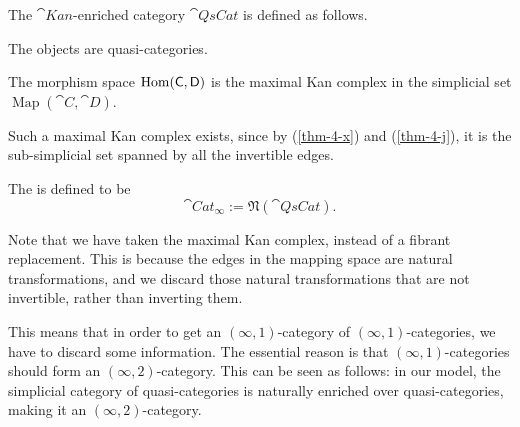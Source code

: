 \begin{example}
    The $\cat{Kan}$-enriched category $\cat{QsCat}$
    is defined as follows.
    \begin{itms}
        \item The objects are quasi-categories.
        \item The morphism space $\operatorname{Hom}(\mathsf{C},\mathsf{D})$
        is the maximal Kan complex in the simplicial set $\operatorname{Map}(\cat C,\cat D)$.
    \end{itms}
    Such a maximal Kan complex exists,
    since by (\ref{thm-4-x}) and (\ref{thm-4-j}),
    it is the sub-simplicial set spanned by all the invertible edges.

    The  is defined to be 
    \[\cat{Cat}_\infty:=\mathfrak N(\cat{QsCat}).\]

    Note that we have taken the maximal Kan complex, instead of a fibrant replacement.
    This is because the edges in the mapping space are natural transformations,
    and we discard those natural transformations that are not invertible,
    rather than inverting them.

    This means that in order to get an $(\infty,1)$-category of $(\infty,1)$-categories,
    we have to discard some information.
    The essential reason is that $(\infty,1)$-categories should form an $(\infty,2)$-category.
    This can be seen as follows:
    in our model, the simplicial category of quasi-categories
    is naturally enriched over quasi-categories,
    making it an $(\infty,2)$-category. \varqed
\end{example}


